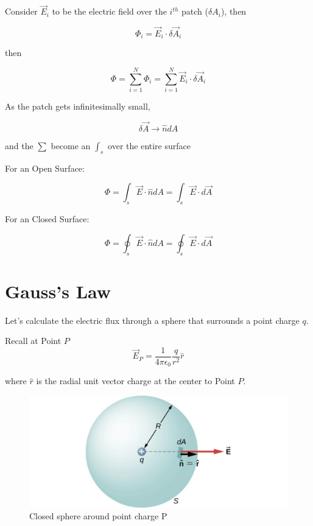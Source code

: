 \documentclass[14pt]{memoir}
\begin{document}
Consider $\vec{E}_i$ to be the electric field over the $i^{th}$ patch ($\delta A_i$), then

\begin{equation}
\Phi_i = \vec{E}_i \cdot \delta \vec{A}_i
\end{equation}

then

\begin{equation}
\Phi = \sum_{i=1}^{N} \Phi_i = \sum_{i=1}^{N} \vec{E}_i \cdot \delta \vec{A}_i
\end{equation}

As the patch gets infinitesimally small, 

\begin{equation}
\delta \vec{A} \rightarrow \hat{n} dA
\end{equation}

and the $\sum$ become an $\int_s$ over the entire surface

For an Open Surface:

\begin{equation}
\Phi = \int_s \vec{E} \cdot \hat{n} dA = \int_s \vec{E}  \cdot d\vec{A}
\end{equation}

For an Closed Surface:

\begin{equation}
\Phi = \oint_s \vec{E} \cdot \hat{n} dA = \oint_s \vec{E}  \cdot d\vec{A}
\label{eq:flux}
\end{equation}

\section{Gauss's Law}

Let's calculate the electric flux through a sphere that surrounds a point charge $q$.

Recall at Point $P$
\begin{equation}
\vec{E}_P = \frac{1}{4 \pi \epsilon_0} \frac{q}{r^2} \hat{r}
\end{equation}

where $\hat{r}$ is the radial unit vector charge at the center to Point $P$.

\begin{figure}[H]
\begin{center}
\includegraphics[scale=0.40]{fig/fig_06_13.jpg}
\caption{Closed sphere around point charge P}
\label{fig:06_13}
\end{center}
\end{figure}
\end{document}
